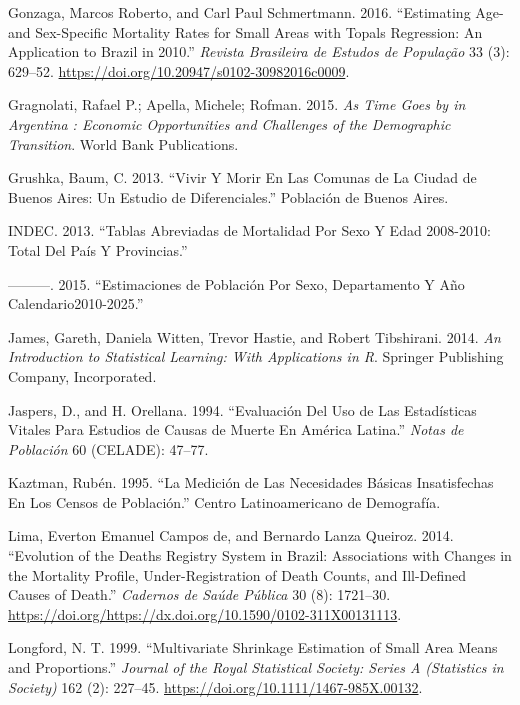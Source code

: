 \documentclass[12pt,]{article}
\begin{document}
\leavevmode\hypertarget{ref-Gonzaga_Schmertmann_2016}{}%
Gonzaga, Marcos Roberto, and Carl Paul Schmertmann. 2016. ``Estimating
Age- and Sex-Specific Mortality Rates for Small Areas with Topals
Regression: An Application to Brazil in 2010.'' \emph{Revista Brasileira
de Estudos de População} 33 (3): 629--52.
\url{https://doi.org/10.20947/s0102-30982016c0009}.

\leavevmode\hypertarget{ref-Gragnolati2015}{}%
Gragnolati, Rafael P.; Apella, Michele; Rofman. 2015. \emph{As Time Goes
by in Argentina : Economic Opportunities and Challenges of the
Demographic Transition}. World Bank Publications.

\leavevmode\hypertarget{ref-Grushka2013}{}%
Grushka, Baum, C. 2013. ``Vivir Y Morir En Las Comunas de La Ciudad de
Buenos Aires: Un Estudio de Diferenciales.'' Población de Buenos Aires.

\leavevmode\hypertarget{ref-INDEC2013}{}%
INDEC. 2013. ``Tablas Abreviadas de Mortalidad Por Sexo Y Edad
2008-2010: Total Del País Y Provincias.''

\leavevmode\hypertarget{ref-INDEC2015}{}%
---------. 2015. ``Estimaciones de Población Por Sexo, Departamento Y
Año Calendario2010-2025.''

\leavevmode\hypertarget{ref-James2014}{}%
James, Gareth, Daniela Witten, Trevor Hastie, and Robert Tibshirani.
2014. \emph{An Introduction to Statistical Learning: With Applications
in R}. Springer Publishing Company, Incorporated.

\leavevmode\hypertarget{ref-JaspersOrellana1994}{}%
Jaspers, D., and H. Orellana. 1994. ``Evaluación Del Uso de Las
Estadísticas Vitales Para Estudios de Causas de Muerte En América
Latina.'' \emph{Notas de Población} 60 (CELADE): 47--77.

\leavevmode\hypertarget{ref-Kaztman1995}{}%
Kaztman, Rubén. 1995. ``La Medición de Las Necesidades Básicas
Insatisfechas En Los Censos de Población.'' Centro Latinoamericano de
Demografía.

\leavevmode\hypertarget{ref-LimaQueiroz2014}{}%
Lima, Everton Emanuel Campos de, and Bernardo Lanza Queiroz. 2014.
``Evolution of the Deaths Registry System in Brazil: Associations with
Changes in the Mortality Profile, Under-Registration of Death Counts,
and Ill-Defined Causes of Death.'' \emph{Cadernos de Saúde Pública} 30
(8): 1721--30.
\url{https://doi.org/https://dx.doi.org/10.1590/0102-311X00131113}.

\leavevmode\hypertarget{ref-Longford1999}{}%
Longford, N. T. 1999. ``Multivariate Shrinkage Estimation of Small Area
Means and Proportions.'' \emph{Journal of the Royal Statistical Society:
Series A (Statistics in Society)} 162 (2): 227--45.
\url{https://doi.org/10.1111/1467-985X.00132}.
\end{document}
